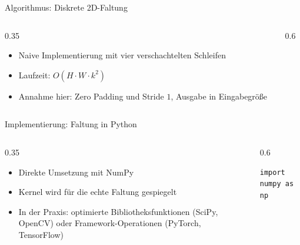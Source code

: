 {%
\begin{frame}{Algorithmus: Diskrete 2D-Faltung}
\begin{columns}
\begin{column}{0.35\textwidth}
\begin{itemize}
    \item Naive Implementierung mit vier verschachtelten Schleifen
    \item Laufzeit: $O(H \cdot W \cdot k^2)$
    \item Annahme hier: Zero Padding und Stride $1$, Ausgabe in Eingabegröße
\end{itemize}
\end{column}
\begin{column}{0.6\textwidth}
\begin{algorithm}[H]
\footnotesize
{}
\;
\end{algorithm}
\end{column}
\end{columns}
\end{frame}

\begin{frame}[fragile]{Implementierung: Faltung in Python}
\begin{columns}
\begin{column}{0.35\textwidth}
\begin{itemize}
    \item Direkte Umsetzung mit NumPy
    \item Kernel wird für die echte Faltung gespiegelt
    \item In der Praxis: optimierte Bibliotheksfunktionen (SciPy, OpenCV) oder Framework-Operationen (PyTorch, TensorFlow)
\end{itemize}
\end{column}
\begin{column}{0.6\textwidth}
\begin{verbatim}
import numpy as np


\end{verbatim}
\end{column}
\end{columns}
\end{frame}}
